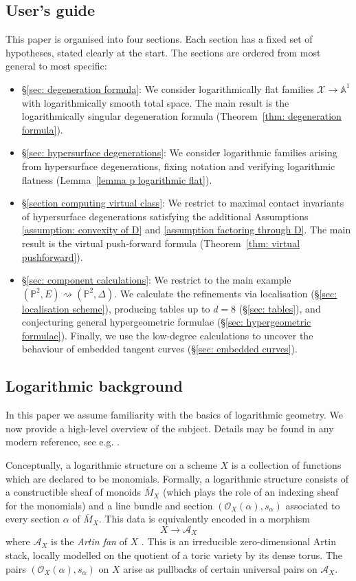 \documentclass[11pt]{amsart}
\theoremstyle{definition}
\theoremstyle{definition}
\newcommand{\Aaff}{\mathbb{A}}
\newcommand{\PP}{\mathbb{P}}
\newcommand{\OO}{\mathcal{O}}
\newcommand{\Acal}{\mathcal{A}}
\newcommand{\Xcal}{\mathcal{X}}
\begin{document}
\subsection{User's guide} This paper is organised into four sections. Each section has a fixed set of hypotheses, stated clearly at the start. The sections are ordered from most general to most specific:
\begin{itemize}
\item \S \ref{sec: degeneration formula}: We consider logarithmically flat families $\Xcal \to \Aaff^{\! 1}$ with logarithmically smooth total space. The main result is the logarithmically singular degeneration formula (Theorem~\ref{thm: degeneration formula}).\medskip
\item \S \ref{sec: hypersurface degenerations}: We consider logarithmic families arising from hypersurface degenerations, fixing notation and verifying logarithmic flatness (Lemma~\ref{lemma p logarithmic flat}).\medskip
\item \S \ref{section computing virtual class}: We restrict to maximal contact invariants of hypersurface degenerations satisfying the additional Assumptions~ \ref{assumption: convexity of D} and \ref{assumption factoring through D}. The main result is the virtual push-forward formula (Theorem~\ref{thm: virtual pushforward}).\medskip
\item \S \ref{sec: component calculations}: We restrict to the main example $(\PP^2,E)\rightsquigarrow(\PP^2,\Delta)$. We calculate the refinements via localisation (\S \ref{sec: localisation scheme}), producing tables up to $d=8$ (\S \ref{sec: tables}), and conjecturing general hypergeometric formulae (\S \ref{sec: hypergeometric formulae}). Finally, we use the low-degree calculations to uncover the behaviour of embedded tangent curves (\S \ref{sec: embedded curves}).
\end{itemize}

\subsection{Logarithmic background} In this paper we assume familiarity with the basics of logarithmic geometry. We now provide a high-level overview of the subject. Details may be found in any modern reference, see e.g. \cite{AbramovichLog, AbramovichEtAlSkeletons,OgusBook}.

Conceptually, a logarithmic structure on a scheme $X$ is a collection of functions which are declared to be monomials. Formally, a logarithmic structure consists of a constructible sheaf of monoids $\overline{M}_X$ (which plays the role of an indexing sheaf for the monomials) and a line bundle and section $(\OO_X(\alpha),s_\alpha)$ associated to every section $\alpha$ of $\overline{M}_X$. This data is equivalently encoded in a morphism
\[ X \to \Acal_X\]
where $\Acal_X$ is the \emph{Artin fan} of $X$ \cite{OlssonLogStacks,BorneVistoli,AbramovichWiseBirational}. This is an irreducible zero-dimensional Artin stack, locally modelled on the quotient of a toric variety by its dense torus. The pairs $(\OO_X(\alpha),s_\alpha)$ on $X$ arise as pullbacks of certain universal pairs on $\Acal_X$.
\end{document}
